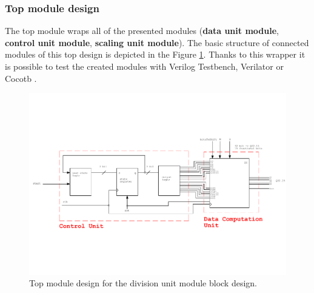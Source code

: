 \documentclass[a4paper, twoside, 11pt]{article}
\newcommand{\fbar}{\FloatBarrier}
\begin{document}
\subsubsection{Top module design}\label{subsubsec:division-top-module-design}
The top module wraps all of the presented modules (\textbf{data unit module}, \textbf{control unit module}, \textbf{scaling unit module}). The basic structure of connected modules of this top design is depicted in the Figure \ref{fig:division-top-module}. Thanks to this wrapper it is possible to test the created modules with Verilog Testbench, Verilator \cite{verilator} or Cocotb \cite{cocotb}.
\begin{figure}[htbp!]
  \centering
  \includegraphics[width=1\textwidth]{src/pdf/top-module.pdf}
   \caption{Top module design for the division unit module block design.}
  \label{fig:division-top-module}
\end{figure}



\fbar
\end{document}
